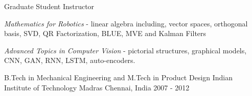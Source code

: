 \begin{cventries2}
\cventry
{Graduate Student Instructor} %
{} %
{} %
{} %
{
	\begin{cvitems} %
		\item {\emph{Mathematics for Robotics} - linear algebra including, vector spaces, orthogonal basis, SVD, QR Factorization, BLUE, MVE and Kalman Filters}
		\item {\emph{Advanced Topics in Computer Vision} - pictorial structures, graphical models, CNN, GAN, RNN, LSTM, auto-encoders. }
	\end{cvitems}
}
\vspace{0.2cm}
\cventry
{B.Tech in Mechanical Engineering and M.Tech in Product Design} %
{Indian Institute of Technology Madras} %
{Chennai, India} %
{2007 - 2012} %
{}
\vspace{-0.5cm}
\end{cventries2}




